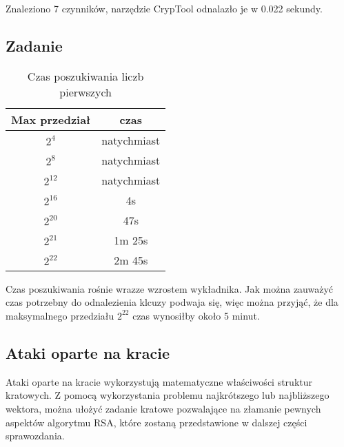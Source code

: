 \documentclass{article}
\begin{document}
Znaleziono 7 czynników, narzędzie CrypTool odnalazło je w 0.022 sekundy.
\subsection{Zadanie}

\begin{table}[H]
    \centering
    \caption{Czas poszukiwania liczb pierwszych}
    \begin{tabular}{|c|c|}
        \hline
        \textbf{}{Max przedział} & \textbf{czas} \\ \hline
        \(2^{4}\)                & natychmiast   \\ \hline
        \(2^{8}\)                & natychmiast   \\ \hline
        \(2^{12}\)               & natychmiast   \\ \hline
        \(2^{16}\)               & 4s            \\ \hline
        \(2^{20}\)               & 47s           \\ \hline
        \(2^{21}\)               & 1m 25s        \\ \hline
        \(2^{22}\)               & 2m 45s        \\ \hline
    \end{tabular}
\end{table}
Czas poszukiwania rośnie wrazze wzrostem wykładnika. Jak można zauważyć czas potrzebny do odnalezienia klcuzy podwaja się,
więc można przyjąć, że dla maksymalnego przedziału \(2^{22}\) czas wynosiłby około 5 minut.

\subsection*{Ataki oparte na kracie}
Ataki oparte na kracie wykorzystują matematyczne właściwości struktur kratowych.
Z pomocą wykorzystania problemu najkrótszego lub najbliższego wektora, można ułożyć
zadanie kratowe pozwalające na złamanie pewnych aspektów algorytmu RSA, które zostaną przedstawione w dalszej części sprawozdania.
\end{document}
